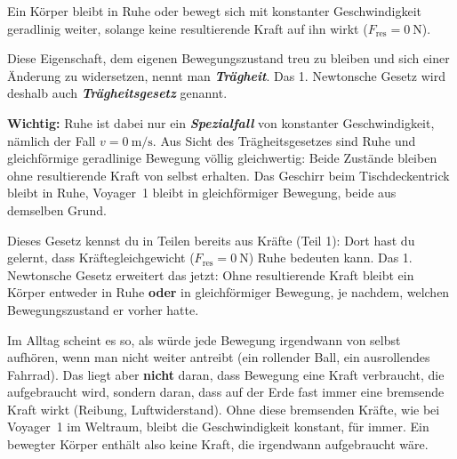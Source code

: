 \documentclass[addpoints,11pt,a4paper]{exam}
\begin{document}
\begin{theoriebox}
\begin{merksatzbox}
Ein Körper bleibt in Ruhe oder bewegt sich mit konstanter Geschwindigkeit
geradlinig weiter, solange keine resultierende Kraft auf ihn wirkt
($F_{\text{res}}=\SI{0}{\newton}$).
\end{merksatzbox}

Diese Eigenschaft, dem eigenen Bewegungszustand \glqq treu zu bleiben\grqq{}
und sich einer Änderung zu widersetzen, nennt man \textbf{\emph{Trägheit}}.
Das 1. Newtonsche Gesetz wird deshalb auch \textbf{\emph{Trägheitsgesetz}}
genannt.

\textbf{Wichtig:} \glqq Ruhe\grqq{} ist dabei nur ein \textbf{\emph{Spezialfall}}
von \glqq konstanter Geschwindigkeit\grqq{}, nämlich der Fall
$v=\SI{0}{\meter\per\second}$. Aus Sicht des Trägheitsgesetzes sind Ruhe
und gleichförmige geradlinige Bewegung völlig gleichwertig: Beide
Zustände bleiben ohne resultierende Kraft von selbst erhalten. Das
Geschirr beim Tischdeckentrick bleibt in Ruhe, Voyager~1 bleibt in
gleichförmiger Bewegung, beide aus demselben Grund.

Dieses Gesetz kennst du in Teilen bereits aus Kräfte (Teil 1): Dort hast
du gelernt, dass Kräftegleichgewicht ($F_{\text{res}}=\SI{0}{\newton}$)
Ruhe bedeuten kann. Das 1. Newtonsche Gesetz erweitert das jetzt: Ohne
resultierende Kraft bleibt ein Körper entweder in Ruhe \textbf{oder} in
gleichförmiger Bewegung, je nachdem, welchen Bewegungszustand er vorher
hatte.
\end{theoriebox}

\begin{hinweisbox}
Im Alltag scheint es so, als würde jede Bewegung irgendwann von selbst
aufhören, wenn man nicht weiter antreibt (ein rollender Ball, ein
ausrollendes Fahrrad). Das liegt aber \textbf{nicht} daran, dass
Bewegung eine \glqq Kraft verbraucht\grqq{}, die \glqq aufgebraucht\grqq{}
wird, sondern daran, dass auf der Erde fast immer eine bremsende Kraft
wirkt (Reibung, Luftwiderstand). Ohne diese bremsenden Kräfte, wie bei
Voyager~1 im Weltraum, bleibt die Geschwindigkeit konstant, für immer.
Ein bewegter Körper \glqq enthält\grqq{} also keine Kraft, die
irgendwann aufgebraucht wäre.
\end{hinweisbox}
\end{document}
